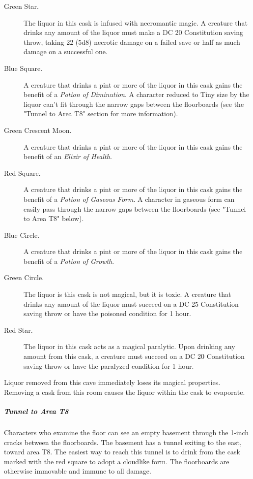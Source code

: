 \documentclass[10pt,a4paper,twoside,bg=print,twocolumn,openany,nodeprecatedcode]{dndbook}
\begin{document}
\begin{description}
\item[Green Star.]
The liquor in this cask is infused with necromantic magic. A creature that drinks any amount of the liquor must make a DC 20 Constitution saving throw, taking 22 (5d8) necrotic damage on a failed save or half as much damage on a successful one.
\item[Blue Square.]
A creature that drinks a pint or more of the liquor in this cask gains the benefit of a \textit{Potion of Diminution}. A character reduced to Tiny size by the liquor can't fit through the narrow gaps between the floorboards (see the "Tunnel to Area T8" section for more information).
\item[Green Crescent Moon.]
A creature that drinks a pint or more of the liquor in this cask gains the benefit of an \textit{Elixir of Health}.
\item[Red Square.]
A creature that drinks a pint or more of the liquor in this cask gains the benefit of a \textit{Potion of Gaseous Form}. A character in gaseous form can easily pass through the narrow gaps between the floorboards (see "Tunnel to Area T8" below).
\item[Blue Circle.]
A creature that drinks a pint or more of the liquor in this cask gains the benefit of a \textit{Potion of Growth}.
\item[Green Circle.]
The liquor is this cask is not magical, but it is toxic. A creature that drinks any amount of the liquor must succeed on a DC 25 Constitution saving throw or have the poisoned condition for 1 hour.
\item[Red Star.]
The liquor in this cask acts as a magical paralytic. Upon drinking any amount from this cask, a creature must succeed on a DC 20 Constitution saving throw or have the paralyzed condition for 1 hour.
\end{description}

Liquor removed from this cave immediately loses its magical properties. Removing a cask from this room causes the liquor within the cask to evaporate.

\subparagraph{Tunnel to Area T8}
Characters who examine the floor can see an empty basement through the 1-inch cracks between the floorboards. The basement has a tunnel exiting to the east, toward area T8. The easiest way to reach this tunnel is to drink from the cask marked with the red square to adopt a cloudlike form. The floorboards are otherwise immovable and immune to all damage.
\end{document}
